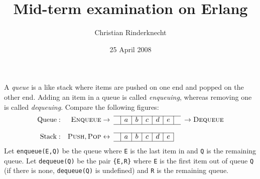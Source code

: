 \documentclass[11pt,a4paper]{article}
\title{Mid-term examination on Erlang}
\author{Christian Rinderknecht}
\date{25 April 2008}
\begin{document}
\maketitle

\thispagestyle{empty}

\noindent A \emph{queue} is a like stack where items are pushed on one
end and popped on the other end. Adding an item in a queue is called
\emph{enqueuing}, whereas removing one is called
\emph{dequeuing}. Compare the following figures:
\[
\begin{array}{rr@{\;}cc|c|c|c|c|c|cc@{\;}l}
\cline{4-10}
\text{Queue}: & \textsc{Enqueue} & \rightarrow & & a & b & c & d & e &
& \rightarrow & \textsc{Dequeue}\\
\cline{4-10}\\
\cline{4-9}
\text{Stack}: & \textsc{Push}, \textsc{Pop} & \leftrightarrow & & a &
b & c & d & e &&&\\
\cline{4-9}
\end{array}
\]
\noindent Let \texttt{enqueue(E,Q)} be the queue where \texttt{E} is
the last item in and \texttt{Q} is the remaining queue. Let
\texttt{dequeue(Q)} be the pair \texttt{\{E,R\}} where \texttt{E} is
the first item out of queue \texttt{Q} (if there is none,
\texttt{dequeue(Q)} is undefined) and \texttt{R} is the remaining
queue.

\bigskip






\end{document}
